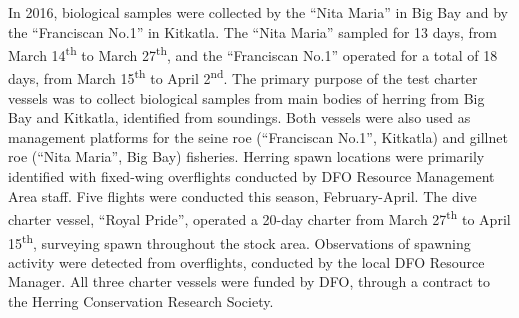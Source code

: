 In 2016, biological samples were collected by the ``Nita Maria'' in Big Bay and by the ``Franciscan No.1'' in Kitkatla.
The ``Nita Maria'' sampled for 13 days, from March 14\textsuperscript{th} to March 27\textsuperscript{th}, and the ``Franciscan No.1'' operated for a total of 18 days, from March 15\textsuperscript{th} to April 2\textsuperscript{nd}.
The primary purpose of the test charter vessels was to collect biological samples from main bodies of herring from Big Bay and Kitkatla, identified from soundings. 
Both vessels were also used as management platforms for the seine roe (``Franciscan No.1'', Kitkatla) and gillnet roe (``Nita Maria'', Big Bay) fisheries. 
Herring spawn locations were primarily identified with fixed-wing overflights conducted by DFO Resource Management Area staff. Five flights were conducted this season, February-April.
The dive charter vessel, ``Royal Pride'', operated a 20-day charter from March 27\textsuperscript{th} to April 15\textsuperscript{th}, surveying spawn throughout the stock area.
Observations of spawning activity were detected from overflights, conducted by the local DFO Resource Manager.
All three charter vessels were funded by DFO, through a contract to the Herring Conservation Research Society.